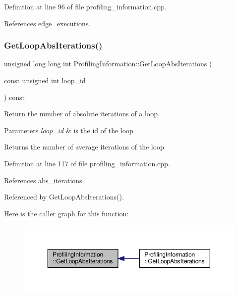 Definition at line 96 of file profiling\+\_\+information.\+cpp.



References edge\+\_\+executions.

\mbox{\label{classProfilingInformation_a64aabe42419cc5a5f0d92530638ae09a}} 
\subsubsection{\texorpdfstring{Get\+Loop\+Abs\+Iterations()}{GetLoopAbsIterations()}\hspace{0.1cm}{\footnotesize\ttfamily [1/2]}}
{\footnotesize\ttfamily unsigned long long int Profiling\+Information\+::\+Get\+Loop\+Abs\+Iterations (\begin{DoxyParamCaption}\item[{const unsigned int}]{loop\+\_\+id }\end{DoxyParamCaption}) const}



Return the number of absolute iterations of a loop. 


\begin{DoxyParams}{Parameters}
{\em loop\+\_\+id} & is the id of the loop \\
\hline
\end{DoxyParams}
\begin{DoxyReturn}{Returns}
the number of average iterations of the loop 
\end{DoxyReturn}


Definition at line 117 of file profiling\+\_\+information.\+cpp.



References abs\+\_\+iterations.



Referenced by Get\+Loop\+Abs\+Iterations().

Here is the caller graph for this function\+:
\nopagebreak
\begin{figure}[H]
\begin{center}
\leavevmode
\includegraphics[width=350pt]{dd/d5b/classProfilingInformation_a64aabe42419cc5a5f0d92530638ae09a_icgraph}
\end{center}
\end{figure}
\mbox{\label{classProfilingInformation_af6b4f658ff4e27fc346f68167dba069a}} 
